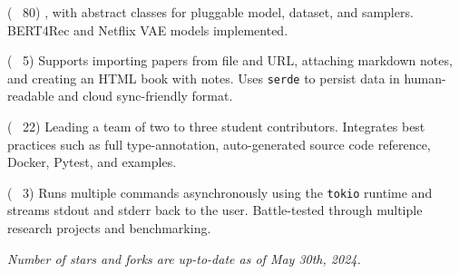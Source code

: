 
\begin{cvlist}

  \cvlistitem
    {\href{https://github.com/jaywonchung/BERT4Rec-VAE-Pytorch}{} 
    {\normalfont( \faCodeFork~80)}} %
    {, with abstract classes for pluggable model, dataset, and samplers. BERT4Rec and Netflix VAE models implemented.} %

  \cvlistitem
    {\href{https://github.com/jaywonchung/reason}{}
    {\normalfont( \faCodeFork~5)}} %
    { Supports importing papers from file and URL, attaching markdown notes, and creating an HTML book with notes. Uses \texttt{serde} to persist data in human-readable and cloud sync-friendly format.} %

  \cvlistitem
    {\href{https://github.com/SymbioticLab/Zeus}{}
    {\normalfont( \faCodeFork~22)}} %
    { Leading a team of two to three student contributors. Integrates best practices such as full type-annotation, auto-generated source code reference, Docker, Pytest, and examples.} %

  \cvlistitem
    {\href{https://github.com/jaywonchung/pegasus}{}
    {\normalfont( \faCodeFork~3)}} %
    { Runs multiple commands asynchronously using the \texttt{tokio} runtime and streams stdout and stderr back to the user. Battle-tested through multiple research projects and benchmarking.} %

\end{cvlist}

\vspace{-5mm}

\begin{cvparagraph}
\textit{Number of stars and forks are up-to-date as of May 30th, 2024.}
\end{cvparagraph}
